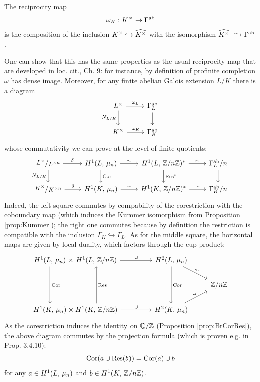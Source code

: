 \documentclass[a4paper, oneside]{memoir}
\begin{document}
\begin{definition}
	The reciprocity map
	\[
		\omega_K:K^\times \to \Gamma^{\text{ab}}
	\]
	is the composition of the inclusion $K^\times \hookrightarrow \widehat{K^\times}$ with the isomorphism $\widehat{\K^\times} \Iso \Gamma^{\text{ab}}$.
\end{definition}

\begin{remark}
	One can show that this has the same properties as the usual reciprocity map that are developed in loc. cit., Ch. 9: for instance,
    by definition of profinite completion $\omega$ has dense image. Moreover, for any finite abelian Galois extension $L / K$ there is a diagram
	\begin{equation}\label{eq:NormDiag}
		\begin{tikzcd}
			L^\times \ar[r, "\omega_L"] \ar[d, swap, "N_{L/\K}"] & \Gamma_L^{\text{ab}} \ar[d] \\
			K^\times \ar[r, "\omega_K"]       & \Gamma_K^{\text{ab}}
		\end{tikzcd}
	\end{equation}
	whose commutativity we can prove at the level of finite quotients:
	\[
		\begin{tikzcd}
			\sfrac{L^\times}{L^{\times n}}\ar[r,"\delta"]\ar[d, swap, "N_{L/\K}"] & \H{1}{L}{\mu_n} \ar[r, "\sim"] \ar[d, "\Cor"] & \H{1}{L}{\Zn}^* \ar[r, "\sim"] \ar[d, "\Res^*"] & \Gamma_L^{\text{ab}}/n \ar[d] \\
			\sfrac{K^\times}{K^{\times n}}\ar[r,"\delta"] & \H{1}{K}{\mu_n} \ar[r, "\sim"] & \H{1}{\K}{\Zn}^* \ar[r, "\sim"] & \Gamma_K^{\text{ab}}/n
		\end{tikzcd}
	\]
	Indeed, the left square commutes by compability of the corestriction with the coboundary map (which induces the Kummer isomorphism from Proposition \ref{prop:Kummer}); the right one commutes because by definition the restriction is compatible with the inclusion $\Gamma_K\hookrightarrow\Gamma_L$. As for the middle square, the horizontal maps are given by local duality, which factors through the cup product:
	\[
		\tikzset{
			symbol/.style={
					draw=none,
					every to/.append style={
							edge node={node [sloped, allow upside down, auto=false]{$#1$}}}
				}
		}
		\begin{tikzcd}
			\H{1}{L}{\mu_n}\ar[dd, "\Cor"]\arrow[r,symbol=\times] &[-2em] \H{1}{L}{\Zn} \ar[r, "\cup"]&[2em] \H{2}{L}{\mu_n} \ar[dd, "\Cor"]\ar[rd, sloped, "\sim"]&\\
			&&& \Zn \\
			\H{1}{\K}{\mu_n} \arrow[r,symbol=\times] & \H{1}{\K}{\Zn}  \ar[swap, uu, "\Res"] \ar[r, "\cup"]& \H{2}{\K}{\mu_n} \ar[ru, sloped, "\sim"]&
		\end{tikzcd}
	\]
	As the corestriction induces the identity on $\mathbb{Q}/\mathbb{Z}$ (Proposition \ref{prop:BrCorRes}), the above diagram commutes by the projection formula (which is proven e.g. in \cite{GilleSzamuely} Prop. 3.4.10):
	\[
		\operatorname{Cor}(a\cup\operatorname{Res}(b))=\operatorname{Cor}(a)\cup b
	\]
	for any $a\in H^{1}( L, \, \mu_n )$ and $b\in H^{1}( K, \, \mathbb{Z}/n\mathbb{Z} )$.


\end{remark}
\end{document}
